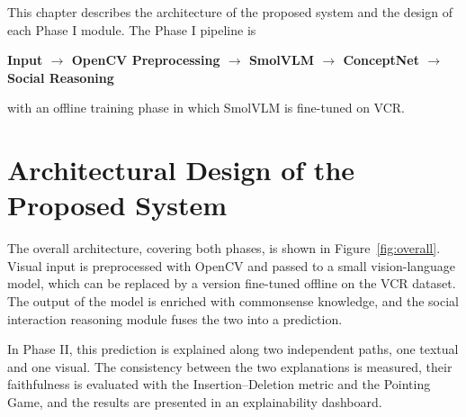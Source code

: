\documentclass[12pt,a4paper,oneside]{report}
\begin{document}
This chapter describes the architecture of the proposed system and the design
of each Phase I module. The Phase I pipeline is
\begin{center}
\textbf{Input $\rightarrow$ OpenCV Preprocessing $\rightarrow$ SmolVLM
$\rightarrow$ ConceptNet $\rightarrow$ Social Reasoning}
\end{center}
with an offline training phase in which SmolVLM is fine-tuned on VCR.

\section{Architectural Design of the Proposed System}

The overall architecture, covering both phases, is shown in
Figure~\ref{fig:overall}. Visual input is preprocessed with OpenCV and passed to
a small vision-language model, which can be replaced by a version fine-tuned
offline on the VCR dataset. The output of the model is enriched with
commonsense knowledge, and the social interaction reasoning module fuses the two
into a prediction.

In Phase II, this prediction is explained along two independent paths, one
textual and one visual. The consistency between the two explanations is
measured, their faithfulness is evaluated with the Insertion--Deletion metric
and the Pointing Game, and the results are presented in an explainability
dashboard.
\end{document}
